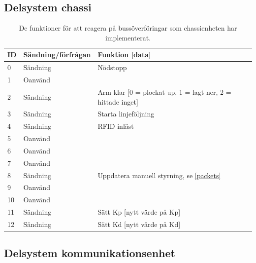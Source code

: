 \subsection{Delsystem chassi}

\begin{table}[H]
\centering

\begin{tabularx}{\textwidth}{|l|l|X|}
\hline
\textbf{ID} & \textbf{Sändning/förfrågan} & \textbf{Funktion [data]} \\ \hline
0 & Sändning & Nödstopp \\ \hline
1 & Oanvänd & \\ \hline
2 & Sändning & Arm klar [0 = plockat up, 1 = lagt ner, 2 = hittade inget] \\ \hline
3 & Sändning & Starta linjeföljning \\ \hline
4 & Sändning & RFID inläst \\ \hline
5 & Oanvänd & \\ \hline
6 & Oanvänd & \\ \hline
7 & Oanvänd & \\ \hline
8 & Sändning & Uppdatera manuell styrning, se \ref{packets}\\ \hline
9 & Oanvänd & \\ \hline
10 & Oanvänd & \\ \hline
11 & Sändning & Sätt Kp [nytt värde på Kp] \\ \hline
12 & Sändning & Sätt Kd [nytt värde på Kd] \\ \hline
\end{tabularx}
\caption{De funktioner för att reagera på bussöverföringar som chassienheten har implementerat.}
\label{tab:callbacks-chassi}
\end{table}

\subsection{Delsystem kommunikationsenhet}


